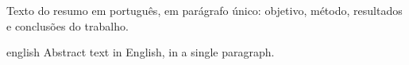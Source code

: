\begin{resumo}
\noindent
Texto do resumo em português, em parágrafo único: objetivo, método,
resultados e conclusões do trabalho.

\end{resumo}

\begin{resumo}[Abstract]
\begin{otherlanguage*}{english}
\noindent
Abstract text in English, in a single paragraph.

\end{otherlanguage*}
\end{resumo}

